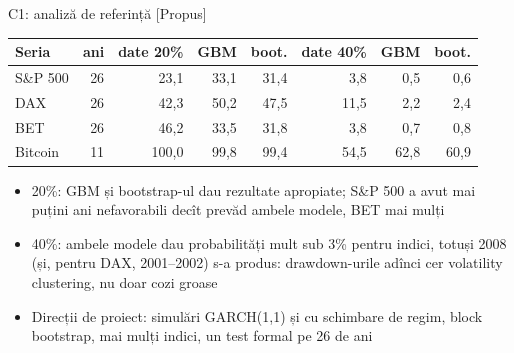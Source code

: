 \ifsolutions
\begin{frame}{C1: analiză de referință [Propus]}
\itemsize{\footnotesize}
\begin{center}
\footnotesize
\begin{tabular}{lrrrrrrr}
\toprule
Seria & ani & date 20\% & GBM & boot. & date 40\% & GBM & boot. \\
\midrule
S\&P 500 & 26 & 23{,}1 & 33{,}1 & 31{,}4 & 3{,}8 & 0{,}5 & 0{,}6 \\
DAX & 26 & 42{,}3 & 50{,}2 & 47{,}5 & 11{,}5 & 2{,}2 & 2{,}4 \\
BET & 26 & 46{,}2 & 33{,}5 & 31{,}8 & 3{,}8 & 0{,}7 & 0{,}8 \\
Bitcoin & 11 & 100{,}0 & 99{,}8 & 99{,}4 & 54{,}5 & 62{,}8 & 60{,}9 \\
\bottomrule
\end{tabular}
\end{center}
\begin{itemize}
    \item 20\%: GBM și bootstrap-ul dau rezultate apropiate; S\&P 500 a avut mai puțini ani nefavorabili decît prevăd ambele modele, BET mai mulți
    \item 40\%: ambele modele dau probabilități mult sub 3\% pentru indici, totuși 2008 (și, pentru DAX, 2001--2002) s-a produs: drawdown-urile adînci cer volatility clustering, nu doar cozi groase
    \item Direcții de proiect: simulări GARCH(1,1) și cu schimbare de regim, block bootstrap, mai mulți indici, un test formal pe 26 de ani
\end{itemize}
\end{frame}
\fi

